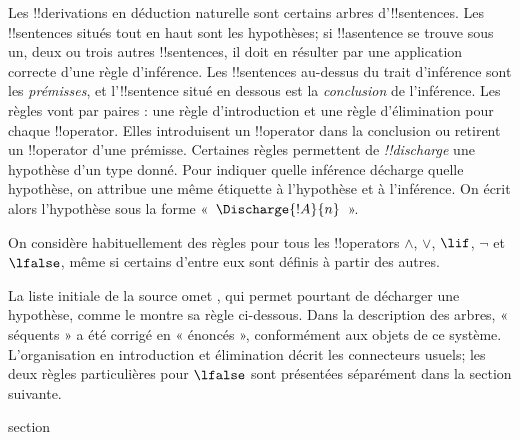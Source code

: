 \documentclass[11pt,a4paper,openany]{memoir}
\begin{document}
Les !!{derivation}s en déduction naturelle sont certains arbres
d'!!{sentence}s. Les !!{sentence}s situés tout en haut sont les
hypothèses; si !!a{sentence} se trouve sous un, deux ou trois autres
!!{sentence}s, il doit en résulter par une application correcte d'une
règle d'inférence. Les !!{sentence}s au-dessus du trait d'inférence
sont les \emph{prémisses}, et l'!!{sentence} situé en dessous est la
\emph{conclusion} de l'inférence. Les règles vont par paires : une
règle d'introduction et une règle d'élimination pour chaque
!!{operator}. Elles introduisent un !!{operator} dans la conclusion
ou retirent un !!{operator} d'une prémisse. Certaines règles
permettent de \emph{!!{discharge}} une hypothèse d'un type donné.
Pour indiquer quelle inférence décharge quelle hypothèse, on attribue
une même étiquette à l'hypothèse et à l'inférence. On écrit alors
l'hypothèse sous la forme «~$\Discharge{!A}{n}$~».


%
    {On considère habituellement des règles pour tous les !!{operator}s $\land$, $\lor$, $\lif$, $\lnot$ et $\lfalse$, même si certains d'entre eux sont définis à partir des autres.}

\begin{editorial}
La liste initiale de la source omet \FalseCl, qui permet pourtant
de décharger une hypothèse, comme le montre sa règle ci-dessous.
Dans la description des arbres, « séquents » a été corrigé en
« énoncés », conformément aux objets de ce système. L'organisation
en introduction et élimination décrit les connecteurs usuels;
les deux règles particulières pour $\lfalse$ sont présentées
séparément dans la section suivante.
\end{editorial}


\endgroup



\begingroup
\expandafter\def\csname ol@sectioncs\endcsname{section}
\def\olfilename{propositional-rules}


      {}
      {}


\end{document}
